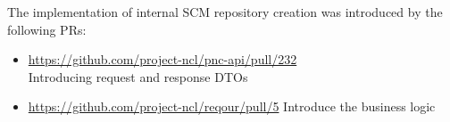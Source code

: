 \documentclass[../main.tex]{subfiles}
\begin{document}
The implementation of internal SCM repository creation was introduced by the following PRs:

\begin{itemize}
    \item \url{https://github.com/project-ncl/pnc-api/pull/232}\\
    Introducing request and response DTOs

    \item \url{https://github.com/project-ncl/reqour/pull/5}
    Introduce the business logic
\end{itemize}
\end{document}
